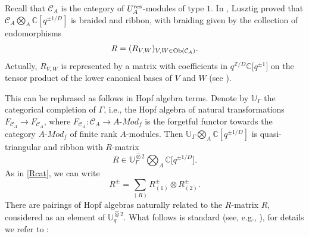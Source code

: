 \documentclass[pdftex]{sigma}
\numberwithin{equation}{section}
\theoremstyle{definition}
\newcommand{\mUq}{\mathbb{U}_q}
\newcommand{\mc}{\mathbb{C}}
\newcommand{\mz}{\mathbb{Z}}
\newcommand{\ra}{\rightarrow}
\begin{document}
Recall that $\mathcal{C}_A$ is the category of $U_A^{\rm res}$-modules of type $1$. In \cite{Lusztig2,Lusztig}, Lusztig proved that $\mathcal{C}_A\bigotimes_A \mc[q^{\pm 1/D}]$ is braided and ribbon, with braiding given by the collection of endomorphisms
\[R = (R_{V,W})_{V,W\in {\rm Ob}(\mathcal{C}_A)}.\]
Actually, $R_{V,W}$ is represented by a matrix with coefficients in $q^{\mz/D}\mc\big[q^{\pm 1}\big]$ on the tensor product of the lower canonical bases of $V$ and $W$ (see \cite[Corollary~24.1.5]{Lusztig}).

This can be rephrased as follows in Hopf algebra terms. Denote by $\mathbb{U}_{\Gamma}$ the categorical completion of $\Gamma$, i.e., the Hopf algebra of natural transformations $F_{\mathcal{C}_A} \ra F_{\mathcal{C}_A}$, where ${F_{\mathcal{C}_A}\colon \mathcal{C}_A\ra A}$-$Mod_f$ is the forgetful functor towards the category $A$-$Mod_f$ of finite rank $A$-modules. Then $\mathbb{U}_{\Gamma}\bigotimes_A \mc[q^{\pm 1/D}]$ is quasi-triangular and ribbon with $R$-matrix
\[R\in \mathbb{U}_{\Gamma}^{\hat{\otimes} 2}\bigotimes_A \mc\bigl[q^{\pm 1/D}\bigr].\]
As in \eqref{Rcat}, we can write
 \[R^\pm=\sum_{(R)}R^\pm_{(1)}\otimes R^\pm_{(2)}.\]
There are pairings of Hopf algebras naturally related to the $R$-matrix $R$, considered as an element of $\mUq^{\hat{\otimes} 2}$. What follows is standard (see, e.g., \cite{KhorTol,KirRes,LS}), for details we refer to \cite[Proposition~3.73, Lemma~3.75, Theorem~3.92, Propositions~3.106 and 3.107]{VY}:
\end{document}
